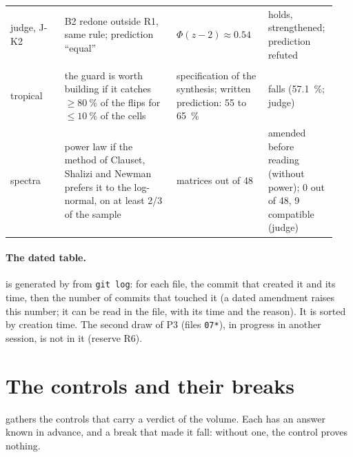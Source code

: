 \begin{longtable}{@{}>{\raggedright\arraybackslash}p{0.16\linewidth}>{\raggedright\arraybackslash}p{0.33\linewidth}>{\raggedright\arraybackslash}p{0.27\linewidth}>{\raggedright\arraybackslash}p{0.18\linewidth}@{}}
judge, J-K2 & B2 redone outside R1, same rule; prediction ``equal'' & $\Phi(z - 2) \approx 0.54$ & holds, strengthened; prediction refuted \\
\multicolumn{4}{@{}l}{\textsf{\bfseries The leads (ch.~\ref{t3tro:ch} and~\ref{t3spe:ch})}} \\
tropical & the guard is worth building if it catches $\ge \SI{80}{\percent}$ of the flips for $\le \SI{10}{\percent}$ of the cells & specification of the synthesis; written prediction: 55 to \SI{65}{\percent} & falls (\SI{57.1}{\percent}; judge) \\
spectra & power law if the method of Clauset, Shalizi and Newman prefers it to the log-normal, on at least 2/3 of the sample & 32 matrices out of 48 & amended before reading (without power); 0 out of 48, 9 compatible (judge) \\
\bottomrule
\end{longtable}
\endgroup

\paragraph{The dated table.}  is generated by  from \texttt{git log}: for each file, the commit that created it and its time, then the number of commits that touched it (a dated amendment raises this number; it can be read in the file, with its time and the reason). It is sorted by creation time. The second draw of P3 (files \texttt{07*}), in progress in another session, is not in it (reserve R6).



\section{The controls and their breaks}\label{t3ann:sec:temoins}

 gathers the controls that carry a verdict of the volume. Each has an answer known in advance, and a break that made it fall: without one, the control proves nothing.

